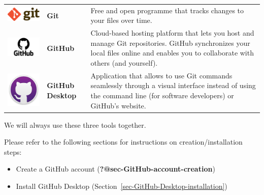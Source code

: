\documentclass[
  letterpaper,
  DIV=11,
  numbers=noendperiod]{scrreprt}
\providecommand{\tightlist}{%
  \setlength{\itemsep}{0pt}\setlength{\parskip}{0pt}}\usepackage{longtable,booktabs,array}
\begin{document}
\begin{longtable}[]{@{}
  >{\centering\arraybackslash}p{}
  >{\centering\arraybackslash}p{}
  >{\raggedright\arraybackslash}p{}@{}}
\toprule()
\endhead
\includegraphics{./images/paste-5B5DE956.png} & \textbf{Git} & Free and
open programme that tracks changes to your files over time. \\
\includegraphics{./images/paste-A0B6FCC4.png} & \textbf{GitHub} &
Cloud-based hosting platform that lets you host and manage Git
repositories. GitHub synchronizes your local files online and enables
you to collaborate with others (and yourself). \\
\includegraphics[width=1.25in,height=\textheight]{./images/paste-B8632B75.png}
& \textbf{GitHub Desktop} & Application that allows to use Git commands
seamlessly through a visual interface instead of using the command line
(for software developers) or GitHub's website. \\
\bottomrule()
\end{longtable}

We will always use these three tools together.

Please refer to the following sections for instructions on
creation/installation steps:

\begin{itemize}
\tightlist
\item
  Create a GitHub account (\textbf{?@sec-GitHub-account-creation})
\item
  Install GitHub Desktop (Section~\ref{sec-GitHub-Desktop-installation})
\end{itemize}
\end{document}
